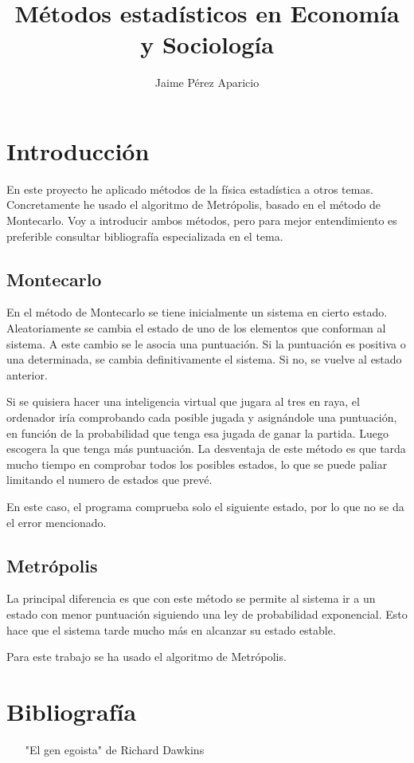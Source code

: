 \documentclass[a4paper,10pt,twocolumn]{article}
\author{Jaime P\'erez Aparicio}
\title{M\'etodos estad\'isticos en Econom\'ia y Sociolog\'ia}
\begin{document}
\maketitle

\section*{Introducci\'on}

En este proyecto he aplicado m\'etodos de la f\'isica estad\'istica a otros temas. Concretamente he usado el algoritmo de Metr\'opolis, basado en el m\'etodo de Montecarlo. Voy a introducir ambos m\'etodos, pero para mejor entendimiento es preferible consultar bibliograf\'ia especializada en el tema.

\subsection*{Montecarlo}

En el m\'etodo de Montecarlo se tiene inicialmente un sistema en cierto estado. Aleatoriamente se cambia el estado de uno de los elementos que conforman al sistema. A este cambio se le asocia una puntuaci\'on. Si la puntuaci\'on es positiva o una determinada, se cambia definitivamente el sistema. Si no, se vuelve al estado anterior. 

Si se quisiera hacer una inteligencia virtual que jugara al tres en raya, el ordenador ir\'ia comprobando cada posible jugada y asign\'andole una puntuaci\'on, en funci\'on de la probabilidad que tenga esa jugada de ganar la partida. Luego escogera la que tenga m\'as puntuaci\'on. La desventaja de este m\'etodo es que tarda mucho tiempo en comprobar todos los posibles estados, lo que se puede paliar limitando el numero de estados que prev\'e. 

En este caso, el programa comprueba solo el siguiente estado, por lo que no se da el error mencionado.

\subsection*{Metr\'opolis}

La principal diferencia es que con este m\'etodo se permite al sistema ir a un estado con menor puntuaci\'on siguiendo una ley de probabilidad exponencial. Esto hace que el sistema tarde mucho m\'as en alcanzar su estado estable.

Para este trabajo se ha usado el algoritmo de Metr\'opolis.



\newpage
\newpage
\section*{Bibliograf\'ia}
\begin{itemize}
\item["El gen egoista" de Richard Dawkins]
\end{itemize}
\end{document}
